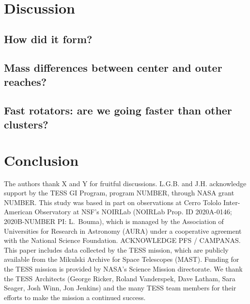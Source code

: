 \documentclass[12pt,twocolumn,tighten]{aastex63}
\begin{document}
\section{Discussion}
\label{sec:discussion}

  \subsection{How did it form?}
  \subsection{Mass differences between center and outer reaches?}
  \subsection{Fast rotators: are we going faster than other clusters?}

\section{Conclusion}
\label{sec:conclusion}




\acknowledgements
\raggedbottom

The authors thank X and Y for fruitful discussions.
%
L.G.B. and J.H. acknowledge support by the TESS GI Program, program
NUMBER, through NASA grant NUMBER.
%
This study was based in part on observations at Cerro Tololo
Inter-American Observatory at NSF's NOIRLab (NOIRLab Prop. ID
2020A-0146; 2020B-NUMBER PI: L{.}~Bouma), which is managed by the
Association of Universities for Research in Astronomy (AURA) under a
cooperative agreement with the National Science Foundation.
%
ACKNOWLEDGE PFS / CAMPANAS.
%
This paper includes data collected by the TESS mission, which are
publicly available from the Mikulski Archive for Space Telescopes
(MAST).
%
Funding for the TESS mission is provided by NASA's Science Mission
directorate.
%
We thank the TESS Architects (George Ricker, Roland Vanderspek, Dave
Latham, Sara Seager, Josh Winn, Jon Jenkins) and the many TESS team
members for their efforts to make the mission a continued success.
%

%
%
\end{document}
